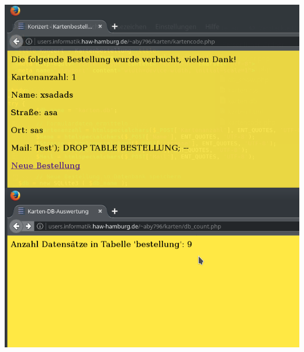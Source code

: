\documentclass[a4paper,10pt]{article}
\begin{document}
\includegraphics[scale=0.7]{sqli_fixed.png}
\end{document}

